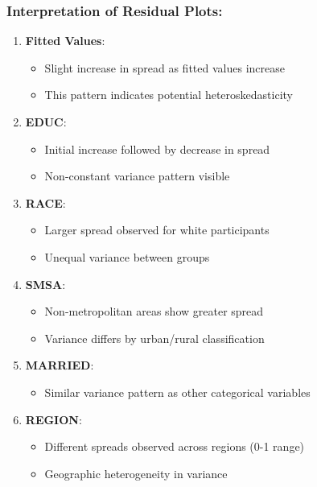 \documentclass[
]{article}
\providecommand{\tightlist}{%
  \setlength{\itemsep}{0pt}\setlength{\parskip}{0pt}}
\begin{document}
\subsubsection{Interpretation of Residual
Plots:}\label{interpretation-of-residual-plots}

\begin{enumerate}
\def\labelenumi{\arabic{enumi}.}
\tightlist
\item
  \textbf{Fitted Values}:

  \begin{itemize}
  \tightlist
  \item
    Slight increase in spread as fitted values increase
  \item
    This pattern indicates potential heteroskedasticity
  \end{itemize}
\item
  \textbf{EDUC}:

  \begin{itemize}
  \tightlist
  \item
    Initial increase followed by decrease in spread
  \item
    Non-constant variance pattern visible
  \end{itemize}
\item
  \textbf{RACE}:

  \begin{itemize}
  \tightlist
  \item
    Larger spread observed for white participants
  \item
    Unequal variance between groups
  \end{itemize}
\item
  \textbf{SMSA}:

  \begin{itemize}
  \tightlist
  \item
    Non-metropolitan areas show greater spread
  \item
    Variance differs by urban/rural classification
  \end{itemize}
\item
  \textbf{MARRIED}:

  \begin{itemize}
  \tightlist
  \item
    Similar variance pattern as other categorical variables
  \end{itemize}
\item
  \textbf{REGION}:

  \begin{itemize}
  \tightlist
  \item
    Different spreads observed across regions (0-1 range)
  \item
    Geographic heterogeneity in variance
  \end{itemize}
\end{enumerate}
\end{document}
